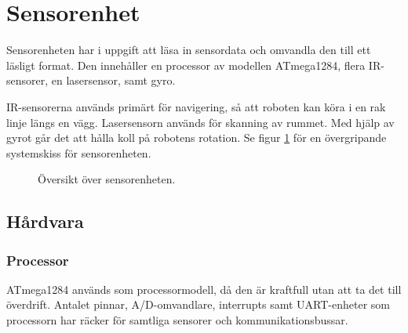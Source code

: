 \documentclass[a4paper,11pt]{article}
\begin{document}
\clearpage
\section{Sensorenhet} \label{sec:system1}
Sensorenheten har i uppgift att läsa in sensordata och omvandla den till ett läsligt format. Den innehåller en processor av modellen ATmega1284, flera IR-sensorer, en lasersensor, samt gyro.

IR-sensorerna används primärt för navigering, så att roboten kan köra i en rak linje längs en vägg. Lasersensorn används för skanning av rummet. Med hjälp av gyrot går det att hålla koll på robotens rotation.
Se figur \ref{fig:unitSensor} för en övergripande systemskiss för sensorenheten.

\begin{figure}[h!]
	\caption{Översikt över sensorenheten.}
	\label{fig:unitSensor}
\end{figure}

\clearpage

\subsection{Hårdvara}

\subsubsection{Processor}
ATmega1284 används som processormodell, då den är kraftfull utan att ta det till överdrift. Antalet pinnar, A/D-omvandlare, interrupts samt UART-enheter som processorn har räcker för samtliga sensorer och kommunikationsbussar.
\end{document}
